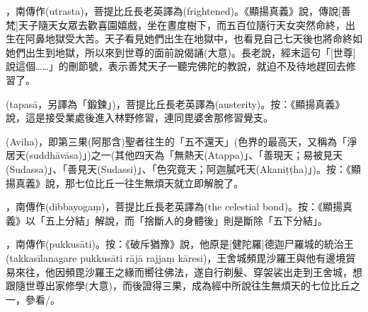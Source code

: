 \startitemgroup[noteitems]
\item{}，南傳作(utrasta)，菩提比丘長老英譯為(frightened)。《顯揚真義》說，傳說[善梵]天子隨天女眾去歡喜園嬉戲，坐在晝度樹下，而五百位隨行天女突然命終，出生在阿鼻地獄受大苦。天子看見她們出生在地獄中，也看見自己七天後也將命終如她們出生到地獄，所以來到世尊的面前說偈誦(大意)。長老說，經末這句「[世尊]說這個……」的刪節號，表示善梵天子一聽完佛陀的教說，就迫不及待地趕回去修習了。
\stopitemgroup

\startitemgroup[noteitems]
\item{}(tapasā，另譯為「鍛鍊」)，菩提比丘長老英譯為(austerity)。按：《顯揚真義》說，這是接受業處後進入林野修習，連同毘婆舍那修習覺支。
\stopitemgroup

\startitemgroup[noteitems]
\item{}(Aviha)，即第三果(阿那含)聖者往生的「五不還天」(色界的最高天，又稱為「淨居天(suddhāvāsa)」)之一(其他四天為「無熱天(Atappa)」、「善現天；易被見天(Sudassa)」、「善見天(Sudassi)」、「色究竟天；阿迦膩吒天(Akaniṭṭha)」)。按：《顯揚真義》說，那七位比丘一往生無煩天就立即解脫了。
\stopitemgroup

\startitemgroup[noteitems]
\item{}，南傳作(dibbayogaṃ)，菩提比丘長老英譯為(the celestial bond)。按：《顯揚真義》以「五上分結」解說，而「捨斷人的身體後」則是斷除「五下分結」。
\stopitemgroup

\startitemgroup[noteitems]
\item{}，南傳作(pukkusāti)。按：《破斥猶豫》說，他原是[健陀羅]德迦尸羅城的統治王(takkasīlanagare pukkusāti rājā rajjaṃ kāresi)，王舍城頻毘沙羅王與他有邊境貿易來往，他因頻毘沙羅王之緣而嚮往佛法，遂自行剃髮、穿袈裟出走到王舍城，想跟隨世尊出家修學(大意)，而後證得三果，成為經中所說往生無煩天的七位比丘之一，參看/。
\stopitemgroup

